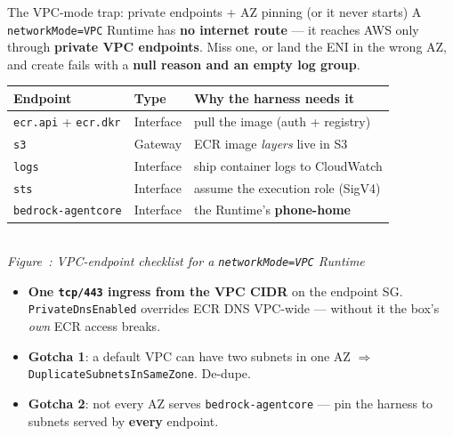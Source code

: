 \documentclass[aspectratio=169]{beamer}
\newcounter{deckfig}
\newcommand{\figtag}[1]{\refstepcounter{deckfig}%
  {\scriptsize\itshape Figure~\thedeckfig: #1}}
\begin{document}
\begin{frame}{The VPC-mode trap: private endpoints + AZ pinning (or it never starts)}
  \footnotesize A \texttt{networkMode=VPC} Runtime has \textbf{no internet route} --- it reaches AWS only
  through \textbf{private VPC endpoints}. Miss one, or land the ENI in the wrong AZ, and create fails with
  a \textbf{null reason and an empty log group}.
  \vspace{0.2em}
  \begin{center}\scriptsize
  \begin{tabular}{@{}p{3.1cm}p{2.0cm}p{5.4cm}@{}}
    \toprule
    \textbf{Endpoint} & \textbf{Type} & \textbf{Why the harness needs it} \\
    \midrule
    \texttt{ecr.api} + \texttt{ecr.dkr} & Interface & pull the image (auth + registry) \\
    \texttt{s3} & Gateway & ECR image \emph{layers} live in S3 \\
    \texttt{logs} & Interface & ship container logs to CloudWatch \\
    \texttt{sts} & Interface & assume the execution role (SigV4) \\
    \texttt{bedrock-agentcore} & Interface & the Runtime's \textbf{phone-home} \\
    \bottomrule
  \end{tabular}
  \\[0.1em]\figtag{VPC-endpoint checklist for a \texttt{networkMode=VPC} Runtime}
  \end{center}
  \vspace{0.2em}
  \begin{itemize}\setlength\itemsep{0.1em}
    \item \textbf{One \texttt{tcp/443} ingress from the VPC CIDR} on the endpoint SG.
      \texttt{PrivateDnsEnabled} overrides ECR DNS VPC-wide --- without it the box's \emph{own} ECR access breaks.
    \item \textbf{Gotcha 1}: a default VPC can have two subnets in one AZ $\Rightarrow$ \texttt{DuplicateSubnetsInSameZone}. De-dupe.
    \item \textbf{Gotcha 2}: not every AZ serves \texttt{bedrock-agentcore} --- pin the harness to subnets served by \textbf{every} endpoint.
  \end{itemize}
\end{frame}
\end{document}
